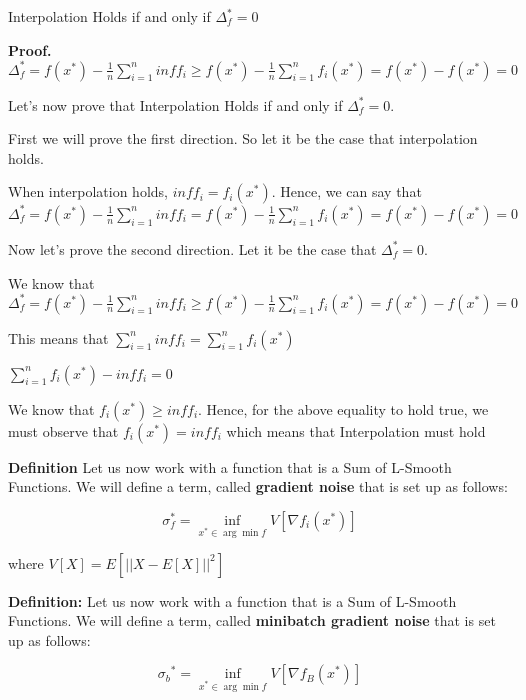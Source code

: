 Interpolation Holds if and only if $\Delta^*_f = 0$ 

\noindent \textbf{Proof.} $\Delta^*_f = f(x^*) - \frac{1}{n} \sum_{i=1}^{n} inf f_i \geq f(x^*) - \frac{1}{n} \sum_{i=1}^{n} f_i(x^*) = f(x^*) - f(x^*) = 0$

Let's now prove that Interpolation Holds if and only if $\Delta^*_f = 0$. 

First we will prove the first direction. So let it be the case that interpolation holds. 

When interpolation holds, $inf f_i = f_i(x^*)$. Hence, we can say that $\Delta^*_f = f(x^*) - \frac{1}{n} \sum_{i=1}^{n} inf f_i = f(x^*) - \frac{1}{n} \sum_{i=1}^{n} f_i(x^*) = f(x^*) - f(x^*) = 0$

Now let's prove the second direction. Let it be the case that $\Delta^*_f = 0$. 

We know that $\Delta^*_f = f(x^*) - \frac{1}{n} \sum_{i=1}^{n} inf f_i \geq f(x^*) - \frac{1}{n} \sum_{i=1}^{n} f_i(x^*) = f(x^*) - f(x^*) = 0$ \newline 

This means that $\sum_{i=1}^{n} inf f_i = \sum_{i=1}^{n} f_i(x^*)$ \newline 

$\sum_{i=1}^{n} f_i(x^*) - inf f_i = 0$ \newline 

We know that $f_i(x^*) \geq inf f_i$. Hence, for the above equality to hold true, we must observe that $f_i(x^*) = inf f_i$ which means that Interpolation must hold

\noindent \textbf{Definition} Let us now work with a function that is a Sum of L-Smooth Functions. We will define a term, called \textbf{gradient noise} that is set up as follows: 

\begin{equation}
    \sigma_f^* = \inf_{x^* \in \arg \min f} V[\nabla f_i(x^*)]
\end{equation}

where $V[X] = E[|| X - E[X] ||^2]$ \newline 

\noindent \textbf{Definition:} Let us now work with a function that is a Sum of L-Smooth Functions. We will define a term, called \textbf{minibatch gradient noise} that is set up as follows: 

\begin{equation}
    {\sigma_b}^* = \inf_{x^* \in \arg \min f} V[\nabla f_B(x^*)]
\end{equation}


